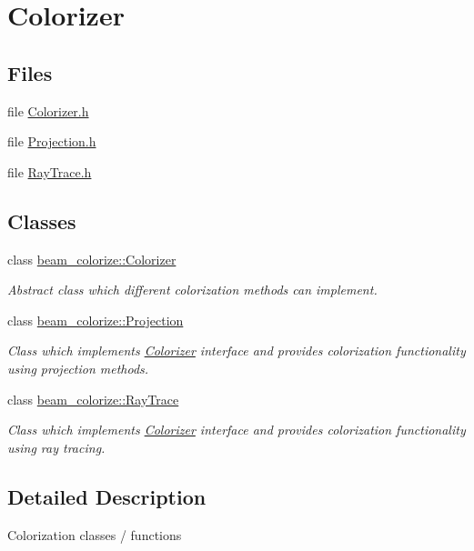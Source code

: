 \hypertarget{group__colorizer}{}\section{Colorizer}
\label{group__colorizer}
\subsection*{Files}
\begin{DoxyCompactItemize}
\item 
file \hyperlink{_colorizer_8h}{Colorizer.\+h}
\item 
file \hyperlink{_projection_8h}{Projection.\+h}
\item 
file \hyperlink{_ray_trace_8h}{Ray\+Trace.\+h}
\end{DoxyCompactItemize}
\subsection*{Classes}
\begin{DoxyCompactItemize}
\item 
class \hyperlink{classbeam__colorize_1_1_colorizer}{beam\+\_\+colorize\+::\+Colorizer}
\begin{DoxyCompactList}\small\item\em Abstract class which different colorization methods can implement. \end{DoxyCompactList}\item 
class \hyperlink{classbeam__colorize_1_1_projection}{beam\+\_\+colorize\+::\+Projection}
\begin{DoxyCompactList}\small\item\em Class which implements \hyperlink{classbeam__colorize_1_1_colorizer}{Colorizer} interface and provides colorization functionality using projection methods. \end{DoxyCompactList}\item 
class \hyperlink{classbeam__colorize_1_1_ray_trace}{beam\+\_\+colorize\+::\+Ray\+Trace}
\begin{DoxyCompactList}\small\item\em Class which implements \hyperlink{classbeam__colorize_1_1_colorizer}{Colorizer} interface and provides colorization functionality using ray tracing. \end{DoxyCompactList}\end{DoxyCompactItemize}


\subsection{Detailed Description}
Colorization classes / functions 